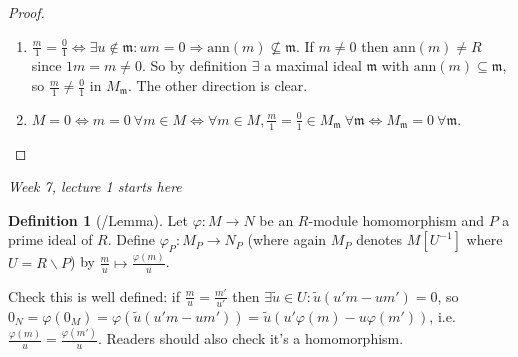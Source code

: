 \documentclass[a4paper]{article}
\newcommand{\m}{\mathfrak m}
\newcommand{\ann}{\text{ann}}
\theoremstyle{definition}
\newtheorem{defn}{Definition}[subsection]
\begin{document}
\begin{proof}
\begin{enumerate}
\item $\frac{m}{1}= \frac01 \Leftrightarrow \exists u\notin\m:um=0 \Rightarrow \ann(m)\not\subseteq \m$. If $m\neq 0$ then $\ann (m)\neq R$ since $1m=m\neq 0$. So by definition $\exists$ a maximal ideal $\m$ with $\ann (m)\subseteq \m$, so $\frac{m}{1}\neq \frac01$ in $M_{\m}$. The other direction is clear.
\item $M=0\Leftrightarrow m=0\ \forall m\in M \Leftrightarrow \forall m\in M, \frac{m}{1}= \frac01 \in M_{\m} \ \forall \m \Leftrightarrow M_{\m}=0 \ \forall \m$.
\end{enumerate}
\end{proof}

\begin{flushright}
\textit{Week 7, lecture 1 starts here}
\end{flushright}

\begin{defn}[/Lemma]
Let $\varphi:M\rightarrow N$ be an $R$-module homomorphism and $P$ a prime ideal of $R$. Define $\varphi_P:M_P\rightarrow N_P$ (where again $M_P$ denotes $M[U^{-1}]$ where $U=R\backslash P$) by $\displaystyle \frac{m}{u}\mapsto\frac{\varphi(m)}{u}$.
\end{defn}
Check this is well defined: if $\frac{m}{u}=\frac{m'}{u'}$ then $\exists \widetilde u\in U:\widetilde u(u'm-um')=0$, so $0_N=\varphi(0_M)=\varphi(\widetilde u(u'm-um'))=\widetilde u (u'\varphi(m)-u\varphi(m'))$, i.e. $\frac{\varphi(m)}{u}=\frac{\varphi(m')}{u}$. Readers should also check it's a homomorphism.
\end{document}
